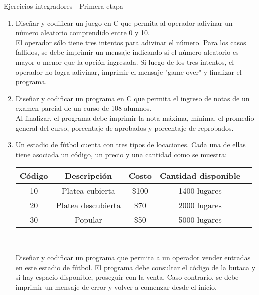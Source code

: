 \documentclass[xcolor=pdftex,table,11pt]{beamer}
\begin{document}
\begin{frame}[allowframebreaks]{Ejercicios integradores - Primera etapa}
 \begin{enumerate}
   
    \item Diseñar y codificar un juego en C que permita al operador adivinar un número aleatorio comprendido entre 0 y 10.\\
    El operador sólo tiene tres intentos para adivinar el número. Para los casos fallidos, se debe imprimir un mensaje indicando si el número aleatorio es mayor o menor que la opción ingresada. Si luego de los tres intentos, el operador no logra adivinar, imprimir el mensaje "game over" y finalizar el programa.
\href{https://github.com/danis963/informaticaI_IUA/blob/main/c/src/5-break_cont_1.c}{}    
    
        \item Diseñar y codificar un programa en C que permita el ingreso de notas de un examen parcial de un curso de 108 alumnos.\\
 Al finalizar, el programa debe imprimir la nota máxima, mínima, el promedio general del curso, porcentaje de aprobados y porcentaje de reprobados.
       \href{https://github.com/danis963/informaticaI_IUA/blob/main/c/src/5-break_cont_1.c}{}


    
 \item Un estadio de fútbol cuenta con tres tipos de locaciones. Cada una de ellas tiene asociada un código, un precio y una cantidad como se muestra:\\
 
 
\bigskip 

\begin{tabular}{|c|c|c|c|c|}
\hline 
Código & Descripción & Costo & Cantidad disponible \\ 
\hline 
10 & Platea cubierta & \$100 & 1400 lugares \\ 
\hline 
20 & Platea descubierta & \$70 & 2000 lugares \\ 
\hline
30 & Popular & \$50 & 5000 lugares \\ 
\hline 
\end{tabular} 
\

\bigskip 
Diseñar y codificar un programa que permita a un operador vender entradas en este estadio de fútbol. El programa debe consultar el código de la butaca y si hay espacio disponible, proseguir con la venta. Caso contrario, se debe imprimir un mensaje de error y volver a comenzar desde el inicio. \\


\end{enumerate}
\end{frame}
\end{document}

